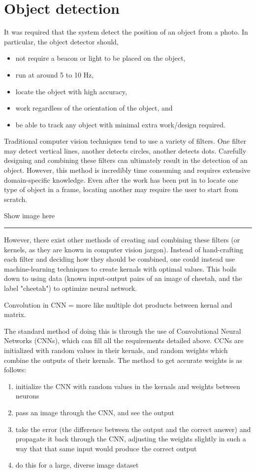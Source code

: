 \section{Object detection}
It was required that the system detect the position of an object from a photo. In particular, the object detector should,

\begin{itemize}
	\item not require a beacon or light to be placed on the object,
	\item run at around 5 to 10 Hz,
	\item locate the object with high accuracy,
	\item work regardless of the orientation of the object, and
	\item be able to track any object with minimal extra work/design required.
\end{itemize}

Traditional computer vision techniques tend to use a variety of filters. One filter may detect vertical lines, another detects circles, another detects dots. Carefully designing and combining these filters can ultimately result in the detection of an object. However, this method is incredibly time consuming and requires extensive domain-specific knowledge. Even after the work has been put in to locate one type of object in a frame, locating another may require the user to start from scratch.

{\Large Show image here}
\hrule

However, there exist other methods of creating and combining these filters (or kernels, as they are known in computer vision jargon). Instead of hand-crafting each filter and deciding how they should be combined, one could instead use machine-learning techniques to create kernals with optimal values. This boils down to using data (known input-output pairs of an image of cheetah, and the label "cheetah") to optimize neural network.

Convolution in CNN = more like multiple dot products between kernal and matrix.

The standard method of doing this is through the use of Convolutional Neural Networks (CNNs), which can fill all the requirements detailed above. CCNs are initialized with random values in their kernals, and random weights which combine the outputs of their kernals. The method to get accurate weights is as follows:

\begin{enumerate}
\item initialize the CNN with random values in the kernals and weights between neurons
\item pass an image through the CNN, and see the output
\item take the error (the difference between the output and the correct answer) and propagate it back through the CNN, adjusting the weights slightly in such a way that that same input would produce the correct output
\item do this for a large, diverse image dataset
\end{enumerate}

